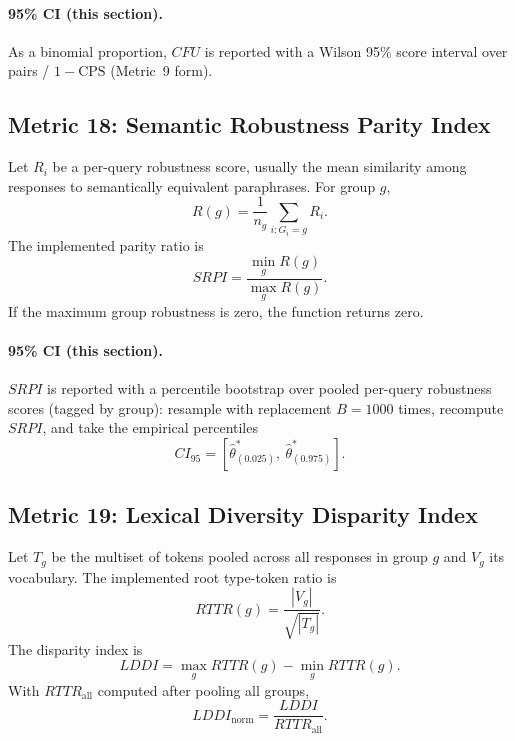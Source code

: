 \documentclass[11pt]{article}
\begin{document}
\paragraph{95\% CI (this section).} As a binomial proportion, $CFU$ is reported with a Wilson 95\% score interval over pairs / $1-\mathrm{CPS}$ (Metric~9 form).

\subsection{Metric 18: Semantic Robustness Parity Index}

Let $R_i$ be a per-query robustness score, usually the mean similarity among
responses to semantically equivalent paraphrases. For group $g$,
\begin{equation}
R(g)=\frac{1}{n_g}\sum_{i:G_i=g}R_i.
\end{equation}
The implemented parity ratio is
\begin{equation}
SRPI=\frac{\min_g R(g)}{\max_g R(g)}.
\end{equation}
If the maximum group robustness is zero, the function returns zero.


\paragraph{95\% CI (this section).} $SRPI$ is reported with a percentile bootstrap over pooled per-query robustness scores (tagged by group): resample with replacement $B=1000$ times, recompute $SRPI$, and take the empirical percentiles
\begin{equation}
CI_{95}=\left[\hat\theta^{\ast}_{(0.025)},\ \hat\theta^{\ast}_{(0.975)}\right].
\end{equation}

\subsection{Metric 19: Lexical Diversity Disparity Index}

Let $T_g$ be the multiset of tokens pooled across all responses in group $g$ and
$V_g$ its vocabulary. The implemented root type-token ratio is
\begin{equation}
RTTR(g)=\frac{|V_g|}{\sqrt{|T_g|}}.
\end{equation}
The disparity index is
\begin{equation}
LDDI=\max_g RTTR(g)-\min_g RTTR(g).
\end{equation}
With $RTTR_{\mathrm{all}}$ computed after pooling all groups,
\begin{equation}
LDDI_{\mathrm{norm}}=\frac{LDDI}{RTTR_{\mathrm{all}}}.
\end{equation}
\end{document}
